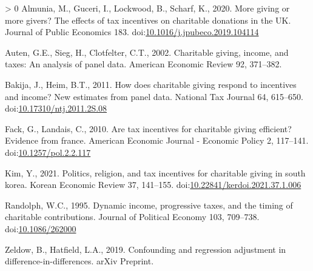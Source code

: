 \documentclass[ review  , 3p ]{elsarticle}
\newlength{\cslhangindent}
\newenvironment{CSLReferences}[3] %
 {%
  \setlength{\parindent}{0pt}
  \ifodd #1 \everypar{\setlength{\hangindent}{\cslhangindent}}\ignorespaces\fi
  \ifnum #2 > 0
  \setlength{\parskip}{#2\baselineskip}
  \fi
 }%
 {}
\begin{document}
  \hypertarget{refs}{}
  \begin{CSLReferences}{1}{0}
  \leavevmode\hypertarget{ref-Almunia2020}{}%
  Almunia, M., Guceri, I., Lockwood, B., Scharf, K., 2020. More giving or more givers? The effects of tax incentives on charitable donations in the UK. Journal of Public Economics 183. doi:\href{https://doi.org/10.1016/j.jpubeco.2019.104114}{10.1016/j.jpubeco.2019.104114}

  \leavevmode\hypertarget{ref-Auten2002}{}%
  Auten, G.E., Sieg, H., Clotfelter, C.T., 2002. Charitable giving, income, and taxes: An analysis of panel data. American Economic Review 92, 371--382.

  \leavevmode\hypertarget{ref-Bakija2011}{}%
  Bakija, J., Heim, B.T., 2011. How does charitable giving respond to incentives and income? New estimates from panel data. National Tax Journal 64, 615--650. doi:\href{https://doi.org/10.17310/ntj.2011.2S.08}{10.17310/ntj.2011.2S.08}

  \leavevmode\hypertarget{ref-Fack2010}{}%
  Fack, G., Landais, C., 2010. Are tax incentives for charitable giving efficient? Evidence from france. American Economic Journal - Economic Policy 2, 117--141. doi:\href{https://doi.org/10.1257/pol.2.2.117}{10.1257/pol.2.2.117}

  \leavevmode\hypertarget{ref-Kim2021}{}%
  Kim, Y., 2021. Politics, religion, and tax incentives for charitable giving in south korea. Korean Economic Review 37, 141--155. doi:\href{https://doi.org/10.22841/kerdoi.2021.37.1.006}{10.22841/kerdoi.2021.37.1.006}

  \leavevmode\hypertarget{ref-Randolph1995}{}%
  Randolph, W.C., 1995. Dynamic income, progressive taxes, and the timing of charitable contributions. Journal of Political Economy 103, 709--738. doi:\href{https://doi.org/10.1086/262000}{10.1086/262000}

  \leavevmode\hypertarget{ref-Zeldow2019}{}%
  Zeldow, B., Hatfield, L.A., 2019. Confounding and regression adjustment in difference-in-differences. arXiv Preprint.

  \end{CSLReferences}
\end{document}
